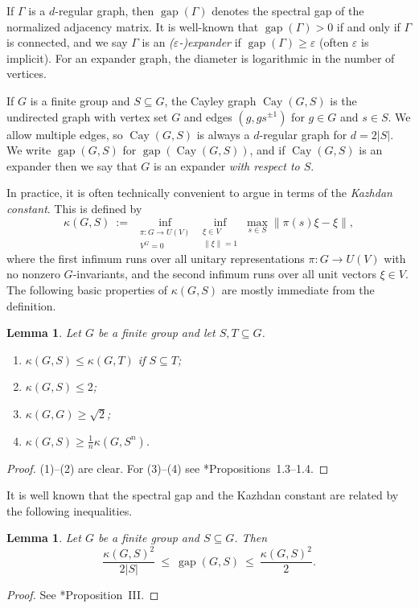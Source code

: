 \documentclass[11pt]{amsart}
\numberwithin{equation}{section}
\newtheorem{lemma}[theorem]{Lemma}
\theoremstyle{remark}
\newcommand{\op}{\operatorname}
\newcommand{\Cay}{\op{Cay}}
\newcommand{\gap}{\op{gap}}
\newcommand\eps{\varepsilon}
\def\kaz{\kappa}
\begin{document}
If $\Gamma$ is a $d$-regular graph,
then $\gap(\Gamma)$ denotes the spectral gap of the normalized adjacency matrix.
It is well-known that $\gap(\Gamma) > 0$ if and only if $\Gamma$ is connected,
and we say $\Gamma$ is an \emph{($\eps$-)expander} if $\gap(\Gamma) \ge \eps$ (often $\eps$ is implicit).
For an expander graph, the diameter is logarithmic in the number of vertices.

If $G$ is a finite group and $S \subseteq G$, the Cayley graph $\Cay(G, S)$ is the undirected graph with vertex set $G$ and edges $(g, gs^{\pm1})$ for $g \in G$ and $s \in S$.
We allow multiple edges, so $\Cay(G, S)$ is always a $d$-regular graph for $d = 2|S|$.
We write $\gap(G, S)$ for $\gap(\Cay(G, S))$, and if $\Cay(G, S)$ is an expander then we say that $G$ is an expander \emph{with respect to $S$}.

In practice, it is often technically convenient to argue in terms of the \emph{Kazhdan constant}.
This is defined by
\[
    \kaz(G, S) \> := \>
    \inf_{\substack{\pi \colon G \to U(V) \\ V^G = 0}}
    \inf_{\substack{\xi \in V \\ \|\xi\| = 1}}
    \max_{s \in S} \|\pi(s) \xi - \xi\| ,
\]
where the first infimum runs over all unitary representations $\pi \colon G \to U(V)$ with no nonzero $G$-invariants,
and the second infimum runs over all unit vectors $\xi \in V$.
The following basic properties of $\kaz(G,S)$ are mostly immediate from the definition.

\begin{lemma}
    \label{lem:kaz-basics}
    Let $G$ be a finite group and let $S, T \subseteq G$.
    \begin{enumerate}
        \item $\kaz(G, S) \le \kaz(G, T)$ if $S \subseteq T$;
        \item $\kaz(G, S) \le 2$;
        \item $\kaz(G, G) \ge \sqrt 2$;
        \item $\kaz(G, S) \ge \frac1n \kaz(G, S^n)$.
    \end{enumerate}
\end{lemma}
\begin{proof}
    (1)--(2) are clear. For (3)--(4) see \cite{Kas07}*{Propositions~1.3--1.4}.
\end{proof}

It is well known that the spectral gap and the Kazhdan constant are related by the following inequalities.

\begin{lemma}
    \label{lemKazSG}
    Let $G$ be a finite group and $S \subseteq G$.
    Then
    \[
        \frac{\kaz(G,S)^2}{2|S|}
        \> \le \> \gap(G,S)
        \> \le \> \frac{\kaz(G,S)^2}{2}.
    \]
\end{lemma}
\begin{proof}
    See \cite{dHRV93}*{Proposition~III}.
\end{proof}
\end{document}
